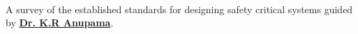 \documentclass[letterpaper]{deedy-resume} %
\begin{document}
\begin{minipage}[t]{0.74\textwidth}
\sectionspace %


 \\
\begin{tightitemize}
\item[] A survey of the established standards for designing safety critical systems guided by \textbf{\href{http://universe.bits-pilani.ac.in/goa/anupkr/profile}{Dr. K.R Anupama}}.
\end{tightitemize}

\sectionspace %


\end{minipage} %



\end{document}
